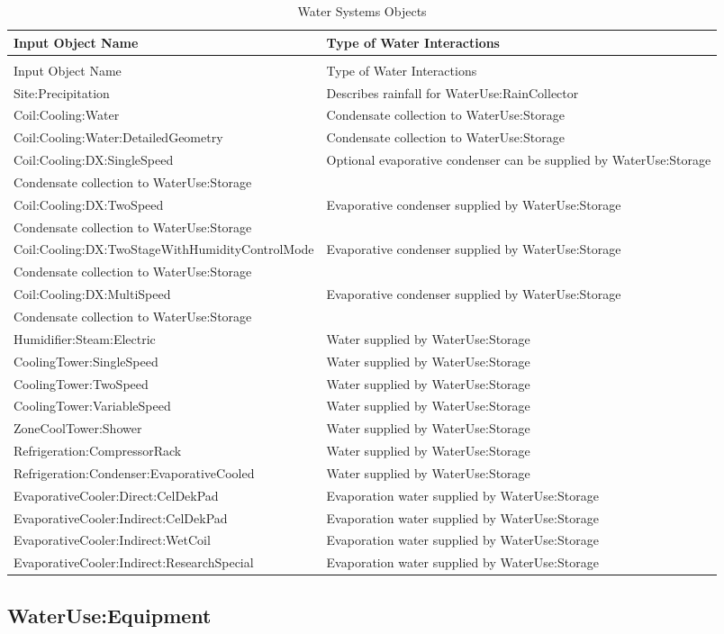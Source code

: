 \begin{longtable}[c]{p{2.49in}p{3.5in}}
\caption{Water Systems Objects \label{table:water-systems-objects}} \tabularnewline
\toprule
Input Object Name & Type of Water Interactions \tabularnewline
\midrule
\endfirsthead

\caption[]{Water Systems Objects} \tabularnewline
\toprule
Input Object Name & Type of Water Interactions \tabularnewline
\midrule
\endhead

Site:Precipitation & Describes rainfall for WaterUse:RainCollector \tabularnewline
Coil:Cooling:Water & Condensate collection to WaterUse:Storage \tabularnewline
Coil:Cooling:Water:DetailedGeometry & Condensate collection to WaterUse:Storage \tabularnewline
Coil:Cooling:DX:SingleSpeed & Optional evaporative condenser can be supplied by WaterUse:Storage \tabularnewline
Condensate collection to WaterUse:Storage \tabularnewline
Coil:Cooling:DX:TwoSpeed & Evaporative condenser supplied by WaterUse:Storage \tabularnewline
Condensate collection to WaterUse:Storage \tabularnewline
Coil:Cooling:DX:TwoStageWithHumidityControlMode & Evaporative condenser supplied by WaterUse:Storage \tabularnewline
Condensate collection to WaterUse:Storage \tabularnewline
Coil:Cooling:DX:MultiSpeed & Evaporative condenser supplied by WaterUse:Storage \tabularnewline
Condensate collection to WaterUse:Storage \tabularnewline
Humidifier:Steam:Electric & Water supplied by WaterUse:Storage \tabularnewline
CoolingTower:SingleSpeed & Water supplied by WaterUse:Storage \tabularnewline
CoolingTower:TwoSpeed & Water supplied by WaterUse:Storage \tabularnewline
CoolingTower:VariableSpeed & Water supplied by WaterUse:Storage \tabularnewline
ZoneCoolTower:Shower & Water supplied by WaterUse:Storage \tabularnewline
Refrigeration:CompressorRack & Water supplied by WaterUse:Storage \tabularnewline
Refrigeration:Condenser:EvaporativeCooled & Water supplied by WaterUse:Storage \tabularnewline
EvaporativeCooler:Direct:CelDekPad & Evaporation water supplied by WaterUse:Storage \tabularnewline
EvaporativeCooler:Indirect:CelDekPad & Evaporation water supplied by WaterUse:Storage \tabularnewline
EvaporativeCooler:Indirect:WetCoil & Evaporation water supplied by WaterUse:Storage \tabularnewline
EvaporativeCooler:Indirect:ResearchSpecial & Evaporation water supplied by WaterUse:Storage \tabularnewline
\bottomrule
\end{longtable}

\subsection{WaterUse:Equipment}\label{wateruseequipment}

